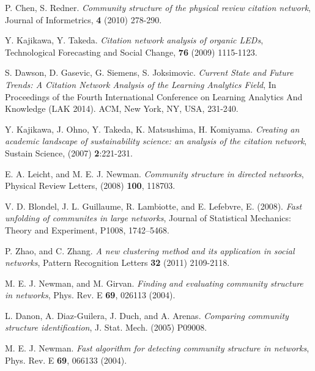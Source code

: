 \documentclass{article} %
\begin{document}
\small{
\begin{thebibliography}{9}
P. Chen, S. Redner. \textit{Community structure of the physical review citation network}, Journal of Informetrics, {\bf 4} (2010) 278-290.

Y. Kajikawa, Y. Takeda. \textit{Citation network analysis of organic LEDs}, Technological Forecasting and Social Change, {\bf 76} (2009) 1115-1123.

S. Dawson, D. Gasevic, G. Siemens, S. Joksimovic. \textit{Current State and Future Trends: A Citation Network Analysis of the Learning Analytics Field}, In Proceedings of the Fourth International Conference on Learning Analytics And Knowledge (LAK 2014). ACM, New York, NY, USA, 231-240.

Y. Kajikawa, J. Ohno, Y. Takeda, K. Matsushima, H. Komiyama. \textit{Creating an academic landscape of sustainability science: an analysis of the citation network}, Sustain Science, (2007) {\bf 2}:221-231.

 E. A. Leicht, and M. E. J. Newman. \textit{Community structure in directed networks}, Physical Review Letters, (2008) {\bf 100}, 118703.

 V. D. Blondel, J. L. Guillaume, R. Lambiotte, and E. Lefebvre, E. (2008). \textit{Fast unfolding of communites in large networks}, Journal of Statistical Mechanics: Theory and Experiment, P1008, 1742–5468.

P. Zhao, and C. Zhang. \textit{A new clustering method and its application in social networks}, Pattern Recognition Letters {\bf 32} (2011) 2109-2118.

M. E. J. Newman, and M. Girvan. \textit{Finding and evaluating community structure in networks}, Phys. Rev. E {\bf 69}, 026113 (2004).

L. Danon, A. Diaz-Guilera, J. Duch, and A. Arenas. \textit{Comparing community structure identification}, J. Stat. Mech. (2005) P09008.

M. E. J. Newman. \textit{Fast algorithm for detecting community structure in networks}, Phys. Rev. E {\bf 69}, 066133 (2004).

\end{thebibliography}
}
\end{document}
